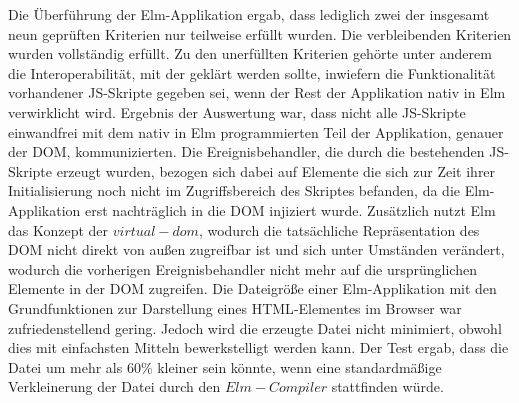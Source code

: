 Die Überführung der Elm-Applikation ergab, dass lediglich zwei der insgesamt neun geprüften Kriterien nur teilweise erfüllt wurden. Die verbleibenden Kriterien wurden vollständig erfüllt. Zu den unerfüllten Kriterien gehörte unter anderem die Interoperabilität, mit der geklärt werden sollte, inwiefern die Funktionalität vorhandener \ac{JS}-Skripte gegeben sei, wenn der Rest der Applikation nativ in Elm verwirklicht wird. Ergebnis der Auswertung war, dass nicht alle \ac{JS}-Skripte einwandfrei mit dem nativ in Elm programmierten Teil der Applikation, genauer der \ac{DOM}, kommunizierten. Die Ereignisbehandler, die durch die bestehenden \ac{JS}-Skripte erzeugt wurden, bezogen sich dabei auf Elemente die sich zur Zeit ihrer Initialisierung noch nicht im Zugriffsbereich des Skriptes befanden, da die Elm-Applikation erst nachträglich in die \ac{DOM} injiziert wurde. Zusätzlich nutzt Elm das Konzept der $virtual-dom$, wodurch die tatsächliche Repräsentation des \ac{DOM} nicht direkt von außen zugreifbar ist und sich unter Umständen verändert, wodurch die vorherigen Ereignisbehandler nicht mehr auf die ursprünglichen Elemente in der \ac{DOM} zugreifen. Die Dateigröße einer Elm-Applikation mit den Grundfunktionen zur Darstellung eines \ac{HTML}-Elementes im Browser war zufriedenstellend gering. Jedoch wird die erzeugte Datei nicht minimiert, obwohl dies mit einfachsten Mitteln bewerkstelligt werden kann. Der Test ergab, dass die Datei um mehr als 60\% kleiner sein könnte, wenn eine standardmäßige Verkleinerung der Datei durch den $Elm-Compiler$ stattfinden würde.

